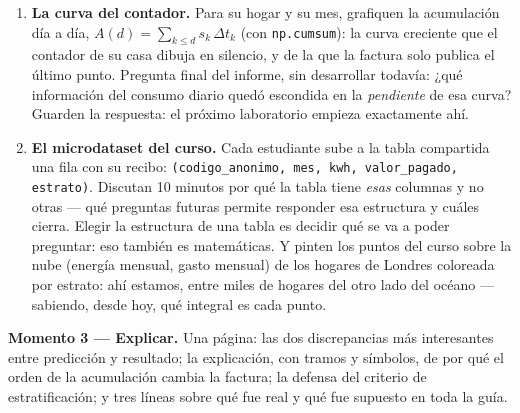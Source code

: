 \documentclass[12pt,letterpaper]{article}
\begin{document}
\begin{enumerate}[label=\arabic*.]
    \item \textbf{La curva del contador.} Para su hogar y su mes, grafiquen la acumulación día a día, $A(d)=\sum_{k\le d}s_k\,\Delta t_k$ (con \texttt{np.cumsum}): la curva creciente que el contador de su casa dibuja en silencio, y de la que la factura solo publica el último punto. Pregunta final del informe, sin desarrollar todavía: ¿qué información del consumo diario quedó escondida en la \emph{pendiente} de esa curva? Guarden la respuesta: el próximo laboratorio empieza exactamente ahí.
    \item \textbf{El microdataset del curso.} Cada estudiante sube a la tabla compartida una fila con su recibo: \texttt{(codigo\_anonimo, mes, kwh, valor\_pagado, estrato)}. Discutan 10 minutos por qué la tabla tiene \emph{esas} columnas y no otras --- qué preguntas futuras permite responder esa estructura y cuáles cierra. Elegir la estructura de una tabla es decidir qué se va a poder preguntar: eso también es matemáticas. Y pinten los puntos del curso sobre la nube (energía mensual, gasto mensual) de los hogares de Londres coloreada por estrato: ahí estamos, entre miles de hogares del otro lado del océano --- sabiendo, desde hoy, qué integral es cada punto.
\end{enumerate}

\textbf{Momento 3 --- Explicar.} Una página: las dos discrepancias más interesantes entre predicción y resultado; la explicación, con tramos y símbolos, de por qué el orden de la acumulación cambia la factura; la defensa del criterio de estratificación; y tres líneas sobre qué fue real y qué fue supuesto en toda la guía.
\end{document}
